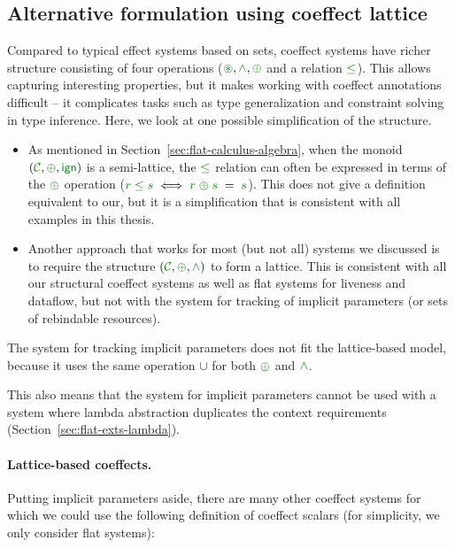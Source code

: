 
\subsection{Alternative formulation using coeffect lattice}
\label{sec:further-impl-semilattice}

Compared to typical effect systems based on sets, coeffect systems have richer structure consisting
of four operations ($\cseq,\czip,\cpar$ and a relation $\cleq$). This allows capturing interesting
properties, but it makes working with coeffect annotations difficult -- it complicates tasks
such as type generalization and constraint solving in type inference. Here, we look at one possible
simplification of the structure.

\begin{itemize}
\item As mentioned in Section~\ref{sec:flat-calculus-algebra}, when the monoid $(\C,\cpar,\czero)$ is a
semi-lattice, the $\cleq$ relation can often be expressed in terms of the $\cpar$ operation
($\cclrd{r} \;\cleq\; \cclrd{s} \;\Longleftrightarrow\; \cclrd{r} \;\cpar\; \cclrd{s} \;=\; \cclrd{s}$).
This does not give a definition equivalent to our, but it is a simplification that is consistent
with all examples in this thesis.

\item Another approach that works for most (but not all) systems we discussed is to require the structure
$(\C,\cpar,\czip)$ to form a lattice. This is consistent with all our structural coeffect systems as
well as flat systems for liveness and dataflow, but not with the system for tracking of implicit
parameters (or sets of rebindable resources).
\end{itemize}

\noindent
The system for tracking implicit parameters does not fit the lattice-based model, because it uses the
same operation $\cup$ for both $\cpar$ and $\czip$.

This also means that the system for implicit parameters cannot be used with a system where lambda
abstraction duplicates the context requirements (Section~\ref{sec:flat-exts-lambda}).

\paragraph{Lattice-based coeffects.} Putting implicit parameters aside, there are many other coeffect
systems for which we could use the following definition of coeffect scalars (for simplicity, we only
consider flat systems):

